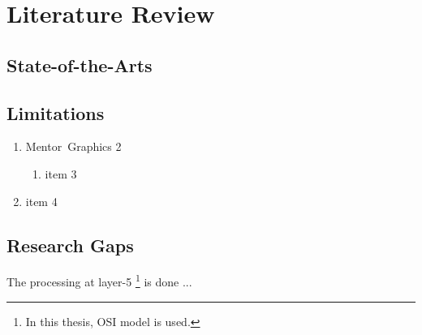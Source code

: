 \chapter{Literature Review}
\label{chap:lit.review}

\section{State-of-the-Arts}

\section{Limitations}
\begin{enumerate}
\item Mentor~Graphics 2
\begin{enumerate}
\item item 3
\end{enumerate}
\item item 4
\end{enumerate}

\section{Research Gaps}
The processing at layer-5%
\footnote{In this thesis, OSI model is used.} is done ...

